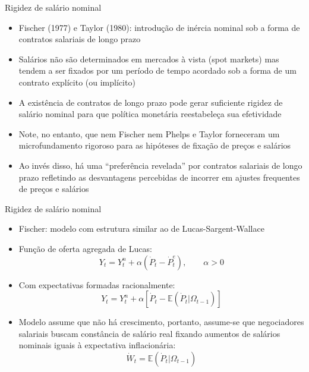 \documentclass[10pt]{beamer}
\begin{document}
\begin{frame}{Rigidez de salário nominal}
    \begin{itemize}
        \item Fischer (1977) e Taylor (1980): introdução de inércia nominal sob a forma de contratos salariais de longo prazo\bigskip
        \item Salários não são determinados em mercados à vista (spot markets) mas tendem a ser fixados por um período de tempo acordado sob a forma de um contrato explícito (ou implícito)\bigskip
        \item A existência de contratos de longo prazo pode gerar suficiente rigidez de salário nominal para que política monetária reestabeleça sua efetividade\bigskip
        \item Note, no entanto, que nem Fischer nem Phelps e Taylor forneceram um microfundamento rigoroso para as hipóteses de fixação de preços e salários\bigskip
        \item Ao invés disso, há uma ``preferência revelada'' por contratos salariais de longo prazo refletindo as desvantagens percebidas de incorrer em ajustes frequentes de preços e salários
    \end{itemize}
\end{frame}

\begin{frame}{Rigidez de salário nominal}
    \begin{itemize}
        \item Fischer: modelo com estrutura similar ao de Lucas-Sargent-Wallace\bigskip
        \item Função de oferta agregada de Lucas:
        \begin{equation}
            Y_t = Y_t^n + \alpha(\dot{P}_t - \dot{P}_t^e), \qquad \alpha > 0
        \end{equation}
        \item Com expectativas formadas racionalmente:
        \begin{equation}
            Y_t = Y_t^n + \alpha\left[\dot{P}_t - \mathbb{E}(\dot{P}_t|\Omega_{t-1})\right]
        \end{equation}
        \item Modelo assume que não há crescimento, portanto, assume-se que negociadores salariais buscam constância de salário real fixando aumentos de salários nominais iguais à expectativa inflacionária:
        \begin{equation}
            \dot{W}_t = \mathbb{E}(\dot{P}_t|\Omega_{t-1})
        \end{equation}
    \end{itemize}
\end{frame}
\end{document}
